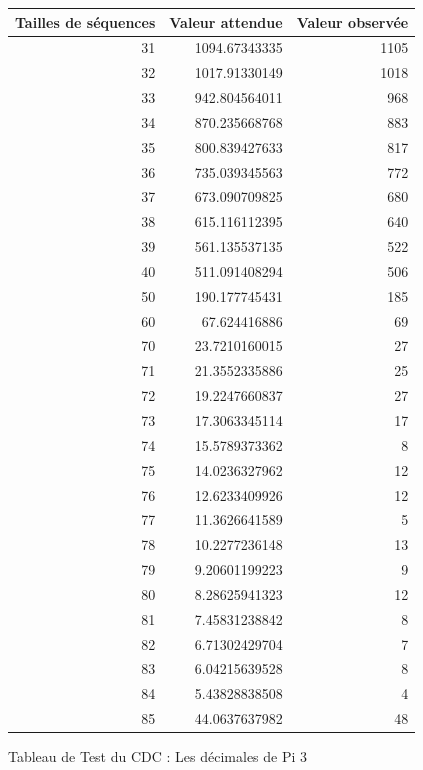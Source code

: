 \documentclass[10pt,a4paper]{article}
\begin{document}
\begin{figure}[h]
\centering
\begin{tabular}{|r|r|r|}
\hline
Tailles de séquences & Valeur attendue & Valeur observée\\
\hline
31 & 1094.67343335 & 1105\\
32 & 1017.91330149 & 1018\\
33 & 942.804564011 & 968\\
34 & 870.235668768 & 883\\
35 & 800.839427633 & 817\\
36 & 735.039345563 & 772\\
37 & 673.090709825 & 680\\
38 & 615.116112395 & 640\\
39 & 561.135537135 & 522\\
40 & 511.091408294 & 506\\
50 & 190.177745431 & 185\\
60 & 67.624416886 & 69\\
70 & 23.7210160015 & 27\\
71 & 21.3552335886 & 25\\
72 & 19.2247660837 & 27\\
73 & 17.3063345114 & 17\\
74 & 15.5789373362 & 8\\
75 & 14.0236327962 & 12\\
76 & 12.6233409926 & 12\\
77 & 11.3626641589 & 5\\
78 & 10.2277236148 & 13\\
79 & 9.20601199223 & 9\\
80 & 8.28625941323 & 12\\
81 & 7.45831238842 & 8\\
82 & 6.71302429704 & 7\\
83 & 6.04215639528 & 8\\
84 & 5.43828838508 & 4\\
85 & 44.0637637982 & 48\\
\hline
\end{tabular}
\caption{Tableau de Test du CDC : Les décimales de Pi 3}
\end{figure}

\newpage
\end{document}
